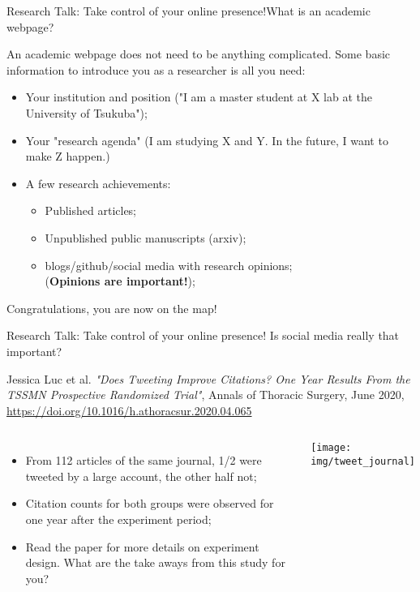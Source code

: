 \begin{frame}{Research Talk: Take control of your online presence!}{What is an academic webpage?}

  An academic webpage does not need to be anything complicated. Some basic information to introduce you as a researcher is all you need:

  \begin{itemize}
    \item Your institution and position ("I am a master student at X lab at the University of Tsukuba");

    \item Your "research agenda" (I am studying X and Y. In the future, I want to make Z happen.)

    \item A few research achievements:
    \begin{itemize}
      \item Published articles;
      \item Unpublished public manuscripts (arxiv);
      \item blogs/github/social media with research opinions;\\
        \hfill ({\bf Opinions are important!});
    \end{itemize}
  \end{itemize}\bigskip

  Congratulations, you are now on the map!
\end{frame}

\begin{frame}{Research Talk: Take control of your online presence!}
  {Is social media really that important?}

  \begin{block}{}
    Jessica Luc et al. \textit{"Does Tweeting Improve Citations? One Year Results From the TSSMN Prospective Randomized Trial"}, Annals of Thoracic Surgery, June 2020, \url{https://doi.org/10.1016/h.athoracsur.2020.04.065}
  \end{block}

  \begin{columns}
    \begin{itemize}
      \item From 112 articles of the same journal, 1/2 were tweeted by a large account, the other half not;
      \item Citation counts for both groups were observed for one year after the experiment period;
      \item Read the paper for more details on experiment design. What are the take aways from this study for you?
    \end{itemize}
    \texttt{[image: img/tweet\_journal]}
  \end{columns}

\end{frame}
